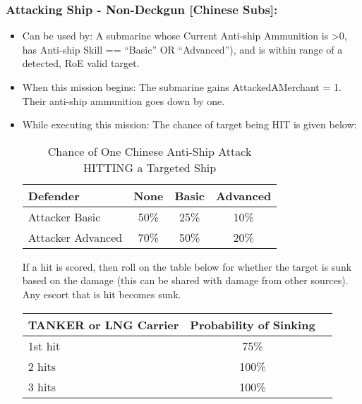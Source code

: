 \documentclass{article}
\begin{document}
    \subsubsection{Attacking Ship - Non-Deckgun [Chinese Subs]:}
        \begin{itemize}
            \item{Can be used by:} A submarine whose Current Anti-ship Ammunition is \textgreater 0, has Anti-ship Skill == ``Basic'' OR ``Advanced''), and is within range of a detected, RoE valid target.
            \item{When this mission begins:} The submarine gains AttackedAMerchant = 1. Their anti-ship ammunition goes down by one.\\ 
            \item{While executing this mission:}
            The chance of target being HIT is given below:\\
            \begin{table}[h!]
                \centering
                \begin{tabular}{lccc}
                    \toprule
                    Defender & None & Basic & Advanced \\
                    \midrule
                    Attacker Basic    & 50\%  & 25\% & 10\% \\
                    Attacker Advanced & 70\%  & 50\% & 20\% \\
                    \bottomrule
                \end{tabular}
                \caption{Chance of One Chinese Anti-Ship Attack HITTING a Targeted Ship}
                \label{tab:ChineseSubmarinesHitProbabilityvs.Ships}
            \end{table}
            If a hit is scored, then roll on the table below for whether the target is sunk based on the damage (this can be shared with damage from other sources). Any escort that is hit becomes sunk.
            \begin{table}[h!]
                \centering
                \begin{tabular}{lcc}
                    \toprule
                    \textbf{TANKER or LNG Carrier} & \textbf{Probability of Sinking} \\
                    \midrule
                    1st hit  & 75\%  \\
                    2 hits & 100\% \\
                    3 hits & 100\% \\
                    \midrule

\end{tabular}
\end{table}
\end{itemize}
\end{document}
